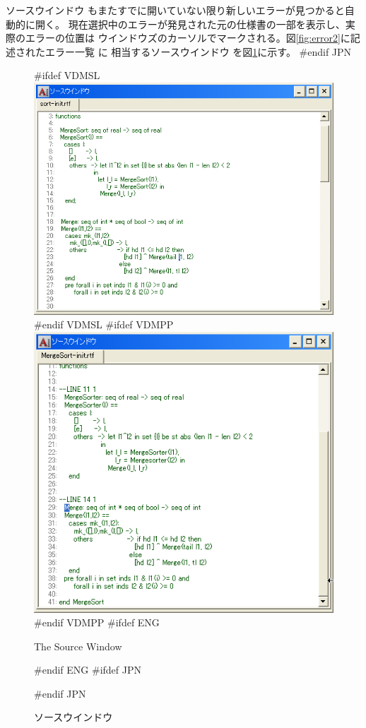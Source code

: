 \documentclass[\pformat,12pt]{article}
\newcommand{\guicmd}[1]{{\sf #1}}
\newcommand{\guicmd}[1]{{\gt #1}}
\begin{document}
\guicmd{ソースウインドウ} もまたすでに開いていない限り新しいエラーが見つかると自動的に開く。
現在選択中のエラーが発見された元の仕様書の一部を表示し、実際のエラーの位置は
ウインドウズのカーソルでマークされる。図\ref{fig:error2}に記述された\guicmd{エラー一覧} に
相当する\guicmd{ソースウインドウ} を図\ref{fig:source2}に示す。
#endif JPN

\begin{figure}[tbh]
\begin{center}
#ifdef VDMSL
\includegraphics[width=\textwidth]{sourceWindow-sl.png}
#endif VDMSL
#ifdef VDMPP
\includegraphics[width=\textwidth]{sourceWindow-pp.png}
#endif VDMPP
#ifdef ENG
\caption{The Source Window}
#endif ENG
#ifdef JPN
\caption{ソースウインドウ}
#endif JPN
\label{fig:source2}
\end{center}
\end{figure}
\end{document}

